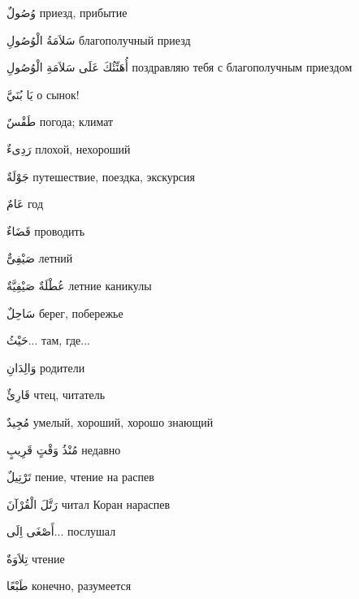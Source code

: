 \documentclass[a5paper]{article}
\newcommand\textstyleDropCaps[1]{#1}
\newcommand\textstyleCaptioncharacters[1]{#1}
\begin{document}
\textstyleCaptioncharacters{وُصُولٌ }\textstyleDropCaps{приезд, прибытие‎}

\textstyleCaptioncharacters{سَلاَمَةُ الْوُصُولِ }\textstyleDropCaps{благо­получный приезд‎}

\textstyleCaptioncharacters{أُهَنِّئُكَ عَلَى سَلاَمَةِ الْوُصُولِ }\textstyleDropCaps{поздравляю тебя с благополучным приездом‎}

\textstyleCaptioncharacters{يَا بُنَيَّ }\textstyleDropCaps{о сынок!‎}

\textstyleCaptioncharacters{طَقْسٌ }\textstyleDropCaps{погода; климат‎}

\textstyleCaptioncharacters{رَدِىءٌ }\textstyleDropCaps{плохой, нехоро­ший‎}

\textstyleCaptioncharacters{جَوْلَةٌ }\textstyleDropCaps{путешествие, поезд­ка, экскурсия‎}

\textstyleCaptioncharacters{عَامٌ }\textstyleDropCaps{год‎}

\textstyleCaptioncharacters{قَضَاءٌ }\textstyleDropCaps{проводить‎}

\textstyleCaptioncharacters{صَيْفِىٌّ }\textstyleDropCaps{летний‎}

\textstyleCaptioncharacters{عُطْلَةٌ صَيْفِيَّةٌ }\textstyleDropCaps{летние ка­никулы‎}

\textstyleCaptioncharacters{سَاحِلٌ }\textstyleDropCaps{берег, побережье‎}

\textstyleCaptioncharacters{حَيْثُ...ِ }\textstyleDropCaps{там, где...‎}

\textstyleCaptioncharacters{وَالِدَانِ }\textstyleDropCaps{родители‎}

\textstyleCaptioncharacters{قَارِئٌ }\textstyleDropCaps{чтец, читатель‎}

\textstyleCaptioncharacters{مُجِيدٌ }\textstyleDropCaps{умелый, хороший, хорошо знающий‎}

\textstyleCaptioncharacters{مُنْذُ وَقْتٍ قَرِيبٍ }\textstyleDropCaps{недавн­о‎}

\textstyleCaptioncharacters{تَرْتِيلٌ }\textstyleDropCaps{пение, чтение на распев‎}

\textstyleCaptioncharacters{رَتَّلَ الْقُرْآنَ }\textstyleDropCaps{читал Коран нараспев‎}

\textstyleCaptioncharacters{أَصْغَى اِلَى...ِ }\textstyleDropCaps{послушал‎}

\textstyleCaptioncharacters{تِلاَوَةٌ }\textstyleDropCaps{чтение‎}

\textstyleCaptioncharacters{طَبْعًا }\textstyleDropCaps{конечно, разумеется‎}
\end{document}
